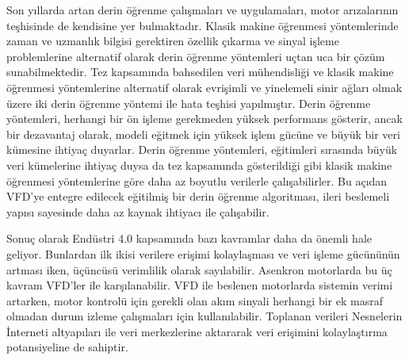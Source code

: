 Son yıllarda artan derin öğrenme çalışmaları ve uygulamaları, motor arızalarının teşhisinde de kendisine yer bulmaktadır. Klasik makine öğrenmesi yöntemlerinde zaman ve uzmanlık bilgisi gerektiren özellik çıkarma ve sinyal işleme problemlerine alternatif olarak derin öğrenme yöntemleri uçtan uca bir çözüm sunabilmektedir. Tez kapsamında bahsedilen veri mühendisliği ve klasik makine öğrenmesi yöntemlerine alternatif olarak evrişimli ve yinelemeli sinir ağları olmak üzere iki derin öğrenme yöntemi ile hata teşhisi yapılmıştır. Derin öğrenme yöntemleri, herhangi bir ön işleme gerekmeden yüksek performans gösterir, ancak bir dezavantaj olarak, modeli eğitmek için yüksek işlem gücüne ve büyük bir veri kümesine ihtiyaç duyarlar. Derin öğrenme yöntemleri, eğitimleri sırasında büyük veri kümelerine ihtiyaç duysa da tez kapsamında gösterildiği gibi klasik makine öğrenmesi yöntemlerine göre daha az boyutlu verilerle çalışabilirler. Bu açıdan VFD'ye entegre edilecek eğitilmiş bir derin öğrenme algoritması, ileri beslemeli yapısı sayesinde daha az kaynak ihtiyacı ile çalışabilir.

Sonuç olarak Endüstri 4.0 kapsamında bazı kavramlar daha da önemli hale geliyor. Bunlardan ilk ikisi verilere erişimi kolaylaşması ve veri işleme gücününün artması iken, üçüncüsü verimlilik olarak sayılabilir. Asenkron motorlarda bu üç kavram VFD'ler ile karşılanabilir. VFD ile beslenen motorlarda sistemin verimi artarken, motor kontrolü için gerekli olan akım sinyali herhangi bir ek masraf olmadan durum izleme çalışmaları için kullanılabilir. Toplanan verileri Nesnelerin İnterneti altyapıları ile veri merkezlerine aktararak veri erişimini kolaylaştırma potansiyeline de sahiptir.
 
